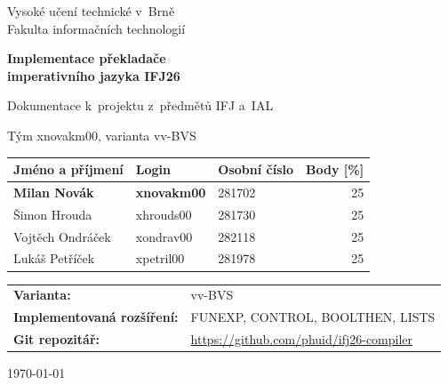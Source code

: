 \documentclass[a4paper,11pt]{article}
\newcommand{\varianta}{vv-BVS}
\newcommand{\rozsireni}{FUNEXP, CONTROL, BOOLTHEN, LISTS}
\begin{document}
\begin{titlepage}
  \centering
  {\Large Vysoké učení technické v~Brně\\
   Fakulta informačních technologií\par}
  \vspace{2cm}
  {\Huge\bfseries Implementace překladače\\imperativního jazyka IFJ26\par}
  \vspace{0.5cm}
  {\large Dokumentace k~projektu z~předmětů IFJ a~IAL\par}
  \vspace{1cm}
  {\large Tým xnovakm00, varianta \varianta\par}
  \vspace{1.5cm}
  \begin{center}
    \begin{tabular}{@{}l l l r@{}}
        \toprule
        \textbf{Jméno a příjmení} & \textbf{Login} & \textbf{Osobní číslo} & \textbf{Body [\%]}\\
        \midrule
        \textbf{Milan Novák} & \textbf{xnovakm00} & {281702} & 25\\
        Šimon Hrouda & xhrouds00 & 281730 & 25\\
        Vojtěch Ondráček & xondrav00 & 282118 & 25\\
        Lukáš Petříček & xpetril00 & 281978 & 25\\
        \bottomrule
    \end{tabular}
  \end{center}

  \vspace{1cm}
  \begin{tabularx}{\textwidth}{@{}l X@{}}
    \textbf{Varianta:} & \varianta\\[4pt]
    \textbf{Implementovaná rozšíření:} & \rozsireni\\[4pt]
    \textbf{Git repozitář:} & \href{https://github.com/phuid/ifj26-compiler}{https://github.com/phuid/ifj26-compiler}\\
  \end{tabularx}

  \vfill
  {\large \today}
\end{titlepage}

\tableofcontents
\newpage

\end{document}
